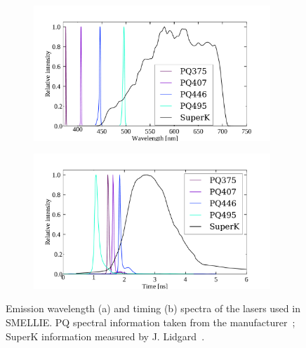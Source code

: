 \begin{figure}
    \centering
    \begin{subfigure}{0.98\textwidth}
        \centering
        \includegraphics[width=0.98\textwidth]{3_SMELLIEHardware/images/smellie_laser_wavelengths.pdf}
        \caption{}
        \label{fig:smellie_emission_wavelengths}
    \end{subfigure}
    \begin{subfigure}{0.98\textwidth}
        \centering
        \includegraphics[width=0.98\textwidth]{3_SMELLIEHardware/images/smellie_laser_timings.pdf}
        \caption{}
        \label{fig:smellie_emission_timing}
    \end{subfigure}
    \caption[Emission wavelength and timing spectra of the lasers used in SMELLIE]
    {Emission wavelength (a) and timing (b) spectra of the lasers used in SMELLIE. PQ spectral information taken from the manufacturer~\cite{}; SuperK information measured by J. Lidgard~\cite{}.}
    \label{fig:smellie_emission_wav_timing}
\end{figure}

